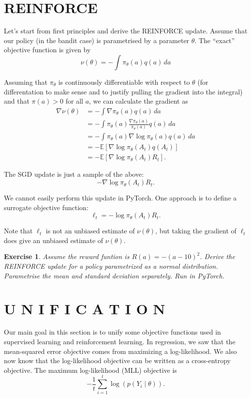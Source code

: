 \documentclass{article}
\date{}
\newcommand{\Ex}{\mathbb{E}}
\newtheorem{exercise}{Exercise}
\begin{document}
\section{REINFORCE}
Let's start from first principles and derive the REINFORCE update. Assume that our policy (in the bandit case) is parametrised by a parameter $\theta$. The ``exact'' objective function is given by
\begin{equation*}
  \nu(\theta) = -\int \pi_\theta(a) q(a) \, da
\end{equation*}

\noindent Assuming that $\pi_\theta$ is continuously differentiable with respect to $\theta$ (for differentation to make sense and to justify pulling the gradient into the integral) and that $\pi(a) > 0$ for all $a$, we can calculate the gradient as
\begin{align*}
  \nabla \nu(\theta) &= -\int \nabla\pi_\theta(a) q(a)\, da\\
  &= -\int \pi_\theta(a) \frac{\nabla \pi_\theta(a)}{\pi_\theta(a)} q(a)\, da\\
  &= -\int \pi_\theta(a) \nabla \log \pi_\theta(a) q(a)\, da\\
  &= -\Ex[\nabla \log \pi_\theta(A_t) q(A_t)]\\
  &= -\Ex[\nabla \log \pi_\theta(A_t) R_t].
\end{align*}

\noindent The SGD update is just a sample of the above:
\begin{equation*}
  -\nabla \log \pi_\theta(A_t) R_t.
\end{equation*}

\noindent We cannot easily perform this update in PyTorch. One approach is to define a surrogate objective function:
\begin{equation*}
  \ell_t = - \log \pi_\theta(A_t) R_t.
\end{equation*}

\noindent Note that $\ell_t$ is not an unbiased estimate of $\nu(\theta)$, but taking the gradient of $\ell_t$ does give an unbiased estimate of $\nu(\theta)$.

\begin{exercise}
  Assume the reward funtion is $R(a) = -(a - 10)^2$. Derive the REINFORCE update for a policy parametrized as a normal distribution. Parametrise the mean and standard deviation separately. Run in PyTorch.
\end{exercise}

\section{U N I F I C A T I O N}
Our main goal in this section is to unify some objective functions used in supervised learning and reinforcement learning. In regression, we saw that the mean-squared error objective comes from maximizing a log-likelihood. We also now know that the log-likelihood objective can be written as a cross-entropy objective. The maximum log-likelihood (MLL) objective is
\begin{equation*}
  -\frac{1}{t} \sum_{i = 1}^t \log(p(Y_i \mid \theta)).
\end{equation*}
\end{document}
